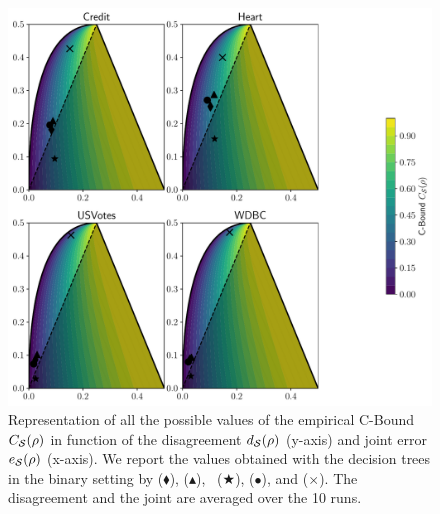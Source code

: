 \begin{noaddcontents}
\begin{figure}
    \centering
    \includegraphics[width=1.0\linewidth]{chapter_4/figures/cbound_tree_binary_1.pdf}
    \caption{
    Representation of all the possible values of the empirical C-Bound ${C}_{\mathcal{S}}(\rho)$ in function of the disagreement $d_{\mathcal{S}}(\rho)$ (y-axis) and joint error $e_{\mathcal{S}}(\rho)$ (x-axis).
We report the values obtained with the decision trees in the binary setting by  ($\blacklozenge$), \algomasegosa ($\blacktriangle$), \algogermain~($\bigstar$), \cbboost ($\bullet$), and \mincq ($\boldsymbol{\times}$).
The disagreement and the joint are averaged over the 10 runs.
    }
    \label{chap:mv:fig:cbound-tree-binary-1}
\end{figure}


\end{noaddcontents}
